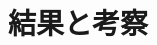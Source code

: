 \documentclass[12pt, a4j, dvipdfmx]{jarticle}
\begin{document}
\section{\large 結果と考察}
\par
\end{document}
